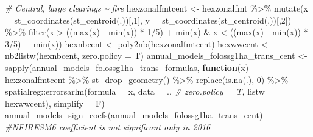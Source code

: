 \documentclass[10pt,landscape,a3paper]{article}
\newenvironment{Shaded}{\begin{snugshade}}{\end{snugshade}}
\newcommand{\AttributeTok}[1]{\textcolor[rgb]{0.77,0.63,0.00}{#1}}
\newcommand{\CommentTok}[1]{\textcolor[rgb]{0.56,0.35,0.01}{\textit{#1}}}
\newcommand{\ControlFlowTok}[1]{\textcolor[rgb]{0.13,0.29,0.53}{\textbf{#1}}}
\newcommand{\DecValTok}[1]{\textcolor[rgb]{0.00,0.00,0.81}{#1}}
\newcommand{\FunctionTok}[1]{\textcolor[rgb]{0.00,0.00,0.00}{#1}}
\newcommand{\NormalTok}[1]{#1}
\newcommand{\OtherTok}[1]{\textcolor[rgb]{0.56,0.35,0.01}{#1}}
\newcommand{\SpecialCharTok}[1]{\textcolor[rgb]{0.00,0.00,0.00}{#1}}
\begin{document}
\begin{Shaded}
\begin{Highlighting}[]
\CommentTok{\# Central, large clearings \textasciitilde{} fire}
\NormalTok{hexzonalfmtcent }\OtherTok{\textless{}{-}}\NormalTok{ hexzonalfmt }\SpecialCharTok{\%\textgreater{}\%}
  \FunctionTok{mutate}\NormalTok{(}\AttributeTok{x =} \FunctionTok{st\_coordinates}\NormalTok{(}\FunctionTok{st\_centroid}\NormalTok{(.))[,}\DecValTok{1}\NormalTok{], }\AttributeTok{y =} \FunctionTok{st\_coordinates}\NormalTok{(}\FunctionTok{st\_centroid}\NormalTok{(.))[,}\DecValTok{2}\NormalTok{]) }\SpecialCharTok{\%\textgreater{}\%}
  \FunctionTok{filter}\NormalTok{(x }\SpecialCharTok{\textgreater{}}\NormalTok{ ((}\FunctionTok{max}\NormalTok{(x) }\SpecialCharTok{{-}} \FunctionTok{min}\NormalTok{(x)) }\SpecialCharTok{*} \DecValTok{1}\SpecialCharTok{/}\DecValTok{5}\NormalTok{) }\SpecialCharTok{+} \FunctionTok{min}\NormalTok{(x) }\SpecialCharTok{\&}\NormalTok{ x }\SpecialCharTok{\textless{}}\NormalTok{ ((}\FunctionTok{max}\NormalTok{(x) }\SpecialCharTok{{-}} \FunctionTok{min}\NormalTok{(x)) }\SpecialCharTok{*} \DecValTok{3}\SpecialCharTok{/}\DecValTok{5}\NormalTok{) }\SpecialCharTok{+} \FunctionTok{min}\NormalTok{(x))}
\NormalTok{hexnbcent }\OtherTok{\textless{}{-}} \FunctionTok{poly2nb}\NormalTok{(hexzonalfmtcent)}
\NormalTok{hexwwcent }\OtherTok{\textless{}{-}} \FunctionTok{nb2listw}\NormalTok{(hexnbcent, }\AttributeTok{zero.policy =}\NormalTok{ T)}
\NormalTok{annual\_models\_folossg1ha\_trans\_cent }\OtherTok{\textless{}{-}} \FunctionTok{sapply}\NormalTok{(annual\_models\_folossg1ha\_trans\_formulas,}
                        \ControlFlowTok{function}\NormalTok{(x)}
\NormalTok{                          hexzonalfmtcent }\SpecialCharTok{\%\textgreater{}\%}
                          \FunctionTok{st\_drop\_geometry}\NormalTok{() }\SpecialCharTok{\%\textgreater{}\%}
                          \FunctionTok{replace}\NormalTok{(}\FunctionTok{is.na}\NormalTok{(.), }\DecValTok{0}\NormalTok{) }\SpecialCharTok{\%\textgreater{}\%}
\NormalTok{                          spatialreg}\SpecialCharTok{::}\FunctionTok{errorsarlm}\NormalTok{(}\AttributeTok{formula =}\NormalTok{ x,}
                                                 \AttributeTok{data =}\NormalTok{ ., }\CommentTok{\# zero.policy = T,}
                                                 \AttributeTok{listw =}\NormalTok{ hexwwcent),}
                        \AttributeTok{simplify =}\NormalTok{ F)}
\FunctionTok{annual\_models\_sign\_coefs}\NormalTok{(annual\_models\_folossg1ha\_trans\_cent) }\CommentTok{\#NFIRESM6 coefficient is not significant only in 2016}


\end{Highlighting}
\end{Shaded}
\end{document}
